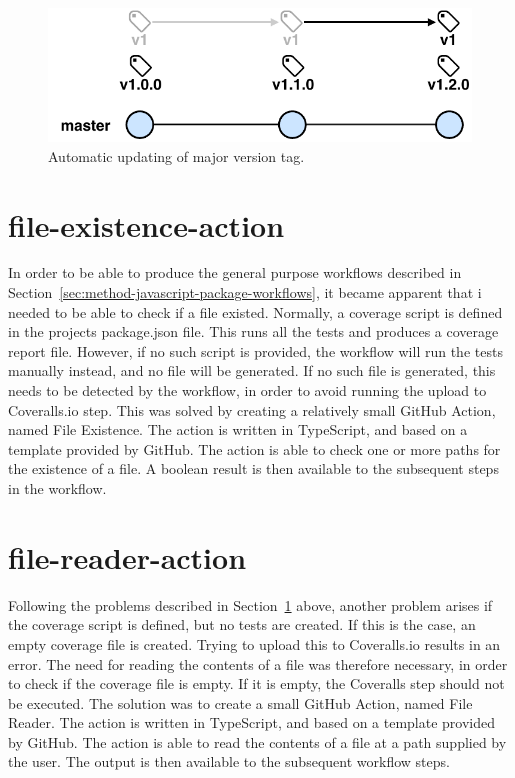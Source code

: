 \begin{figure}[hp]
    \setlength{\abovecaptionskip}{25pt}
    \centering
    \hspace*{-2cm}\includegraphics[page=1,scale=1]{sections/methodology/figures/update-major-tag.pdf}
    \caption{Automatic updating of major version tag.}
    \label{fig:update-major-tag}
\end{figure}

\section{file-existence-action}
\label{sec:method-file-existence-action}
In order to be able to produce the general purpose workflows described in Section~\ref{sec:method-javascript-package-workflows}, it became apparent that i needed to be able to check if a file existed. Normally, a coverage script is defined in the projects package.json file. This runs all the tests and produces a coverage report file. However, if no such script is provided, the workflow will run the tests manually instead, and no file will be generated. If no such file is generated, this needs to be detected by the workflow, in order to avoid running the upload to Coveralls.io step. This was solved by creating a relatively small GitHub Action, named File Existence. The action is written in TypeScript, and based on a template provided by GitHub. The action is able to check one or more paths for the existence of a file. A boolean result is then available to the subsequent steps in the workflow.

\section{file-reader-action}
Following the problems described in Section~\ref{sec:method-file-existence-action} above, another problem arises if the coverage script is defined, but no tests are created. If this is the case, an empty coverage file is created. Trying to upload this to Coveralls.io results in an error. The need for reading the contents of a file was therefore necessary, in order to check if the coverage file is empty. If it is empty, the Coveralls step should not be executed. The solution was to create a small GitHub Action, named File Reader. The action is written in TypeScript, and based on a template provided by GitHub. The action is able to read the contents of a file at a path supplied by the user. The output is then available to the subsequent workflow steps.

